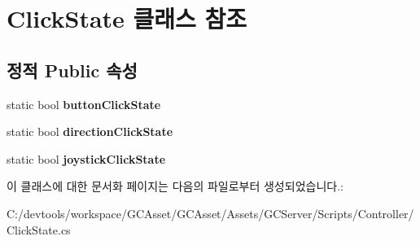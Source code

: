 \hypertarget{class_click_state}{}\section{Click\+State 클래스 참조}
\label{class_click_state}
\subsection*{정적 Public 속성}
\begin{DoxyCompactItemize}
\item 
\hypertarget{class_click_state_ae46f31357d01eb839c10c0dd70563f41}{}static bool {\bfseries button\+Click\+State}\label{class_click_state_ae46f31357d01eb839c10c0dd70563f41}

\item 
\hypertarget{class_click_state_ae91338522a33bf36012e6458c2dcf1a0}{}static bool {\bfseries direction\+Click\+State}\label{class_click_state_ae91338522a33bf36012e6458c2dcf1a0}

\item 
\hypertarget{class_click_state_a468e95244cc87bac4f42ea112cc02ba1}{}static bool {\bfseries joystick\+Click\+State}\label{class_click_state_a468e95244cc87bac4f42ea112cc02ba1}

\end{DoxyCompactItemize}


이 클래스에 대한 문서화 페이지는 다음의 파일로부터 생성되었습니다.\+:\begin{DoxyCompactItemize}
\item 
C\+:/devtools/workspace/\+G\+C\+Asset/\+G\+C\+Asset/\+Assets/\+G\+C\+Server/\+Scripts/\+Controller/Click\+State.\+cs\end{DoxyCompactItemize}
